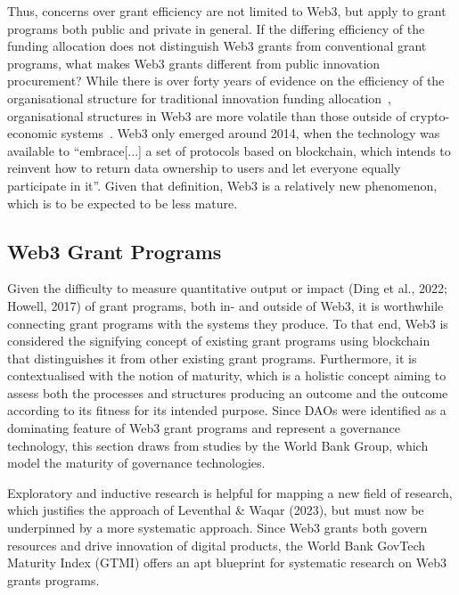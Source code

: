 \documentclass[conference]{IEEEtran}
\begin{document}
Thus, concerns over grant efficiency are not limited to Web3, but apply to grant programs both public and private in general. If the differing efficiency of the funding allocation does not distinguish Web3 grants from conventional grant programs, what makes Web3 grants different from public innovation procurement? While there is over forty years of evidence on the efficiency of the organisational structure for traditional innovation funding allocation~\cite[p.~4]{holmstrom_agency_1989}, organisational structures in Web3 are more volatile than those outside of crypto-economic systems~\cite[p.~25]{zuo_development_2023}. Web3 only emerged around 2014, when the technology was available to ``embrace[...] a set of protocols based on blockchain, which intends to reinvent how to return data ownership to users and let everyone equally participate in it''. Given that definition, Web3 is a relatively new phenomenon, which is to be expected to be less mature.\\

\subsection{Web3 Grant Programs}

Given the difficulty to measure quantitative output or impact (Ding et al., 2022; Howell, 2017) of grant programs, both in- and outside of Web3, it is worthwhile connecting grant programs with the systems they produce. To that end, Web3 is considered the signifying concept of existing grant programs using blockchain that distinguishes it from other existing grant programs. Furthermore, it is contextualised with the notion of maturity, which is a holistic concept aiming to assess both the processes and structures producing an outcome and the outcome according to its fitness for its intended purpose. Since DAOs were identified as a dominating feature of Web3 grant programs and represent a governance technology, this section draws from studies by the World Bank Group, which model the maturity of governance technologies.

Exploratory and inductive research is helpful for mapping a new field of research, which justifies the approach of Leventhal \& Waqar (2023), but must now be underpinned by a more systematic approach. Since Web3 grants both govern resources and drive innovation of digital products, the World Bank GovTech Maturity Index (GTMI) offers an apt blueprint for systematic research on Web3 grants programs.
\end{document}
